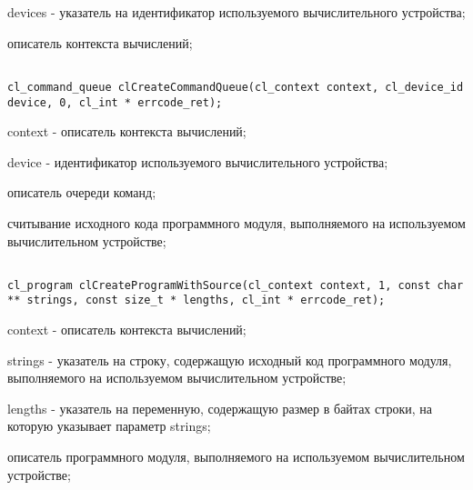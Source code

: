 \begin{enumerate}
\begin{lstlisting}
\end{lstlisting}

		\openclend
		{
			\item devices - указатель на идентификатор используемого вычислительного устройства;
			\errcode
		}
		{описатель контекста вычислений;}


		
\begin{lstlisting}

cl_command_queue clCreateCommandQueue(cl_context context, cl_device_id device, 0, cl_int * errcode_ret);

\end{lstlisting}

		\openclend
		{
			\item context - описатель контекста вычислений;
			\item device - идентификатор используемого вычислительного \linebreak устройства;
			\errcode
		}
		{описатель очереди команд;}


		\item считывание исходного кода программного модуля, выполняемого на используемом вычислительном устройстве;



\begin{lstlisting}

cl_program clCreateProgramWithSource(cl_context context, 1, const char ** strings, const size_t * lengths, cl_int * errcode_ret);

\end{lstlisting}

		\openclend
		{
			\item context - описатель контекста вычислений;
			\item strings - указатель на строку, содержащую исходный код программного модуля, выполняемого на используемом вычислительном устройстве;
			\item lengths - указатель на переменную, содержащую размер в байтах строки, на которую указывает параметр strings;
			\errcodeslb
		}
		{описатель программного модуля, выполняемого на используемом вычислительном устройстве;}


\end{enumerate}
